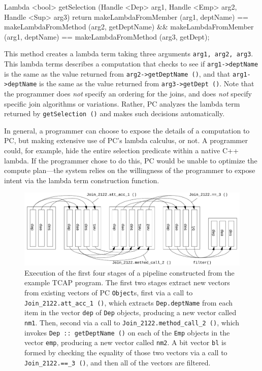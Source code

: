 \begin{codesmall} 
Lambda <bool> getSelection (Handle <Dep> arg1, Handle <Emp> arg2, Handle <Sup> arg3) {
	return makeLambdaFromMember (arg1, deptName) == 
	       makeLambdaFromMethod (arg2, getDeptName) &&
	       makeLambdaFromMember (arg1, deptName) == 
               makeLambdaFromMethod (arg3, getDept);   }
\end{codesmall}

\noindent
This method creates a lambda term taking three arguments \texttt{arg1, arg2, arg3}.  This lambda terms describes a computation that
checks to see if \texttt{arg1->deptName} is the same as the value returned from \texttt{arg2->getDeptName ()}, and
that \texttt{arg1->deptName} is the same as the value returned from \texttt{arg3}\-\texttt{->getDept ()}. 
Note that the programmer does \emph{not} specify an ordering for the joins, and does \emph{not} specify specific join algorithms or variations.  Rather, PC
analyzes the lambda term returned by \texttt{getSelection ()} and
makes such decisions automatically.

In general, a programmer can choose to expose the details of a computation to PC, but making extensive use of PC's lambda
calculus, or not.  A programmer could, for example, hide the entire selection predicate within a native C++ lambda.
If the programmer chose to do this, PC would be unable to optimize the compute plan---the system relies on the willingness of the 
programmer to expose intent via the lambda term construction function.

\begin{figure}[t]
  \begin{center}
    \includegraphics[width=6in]{TCAP}
  \end{center}
\vspace{-10 pt}
  \caption{Execution of the first four stages of a pipeline constructed from the example TCAP program.  The first two stages extract new vectors from 
existing vectors of PC \texttt{Object}s, first via a call to \texttt{Join\_2122.att\_acc\_1 ()}, which extracts \texttt{Dep.deptName} from each item in the vector
\texttt{dep} 
of \texttt{Dep} objects, producing a new vector called \texttt{nm1}. Then, second
via a call to \texttt{Join\_2122.method\_call\_2 ()}, which invokes \texttt{Dep :: getDeptName ()} on each of the \texttt{Emp} objects
in the vector \texttt{emp}, producing a new vector called \texttt{nm2}.  A bit vector \texttt{bl} is formed by checking the equality of those two 
vectors via a call to \texttt{Join\_2122.==\_3 ()}, and then all of the vectors are filtered.}
\vspace{-15 pt}
  \label{fig:TCAP}
\end{figure}


